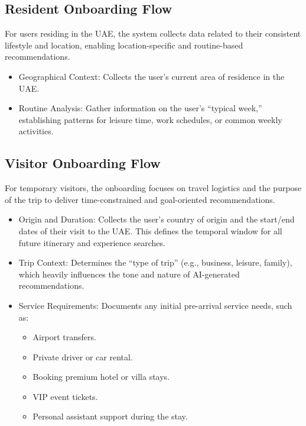 \subsection{Resident Onboarding Flow}
For users residing in the UAE, the system collects data related to their consistent lifestyle and location, enabling location-specific and routine-based recommendations.
\begin{itemize}
    \item Geographical Context: Collects the user's current area of residence in the UAE.
    \item Routine Analysis: Gather information on the user's ``typical week,'' establishing patterns for leisure time, work schedules, or common weekly activities.
\end{itemize}
\subsection{Visitor Onboarding Flow}
For temporary visitors, the onboarding focuses on travel logistics and the purpose of the trip to deliver time-constrained and goal-oriented recommendations.
\begin{itemize}
    \item Origin and Duration: Collects the user's country of origin and the start/end dates of their visit to the UAE. This defines the temporal window for all future itinerary and experience searches.
    \item Trip Context: Determines the ``type of trip'' (e.g., business, leisure, family), which heavily influences the tone and nature of AI-generated recommendations.
    \item Service Requirements: Documents any initial pre-arrival service needs, such as:
    \begin{itemize}
        \item Airport transfers.
        \item Private driver or car rental.
        \item Booking premium hotel or villa stays.
        \item VIP event tickets.
        \item Personal assistant support during the stay.
    \end{itemize}
\end{itemize}
